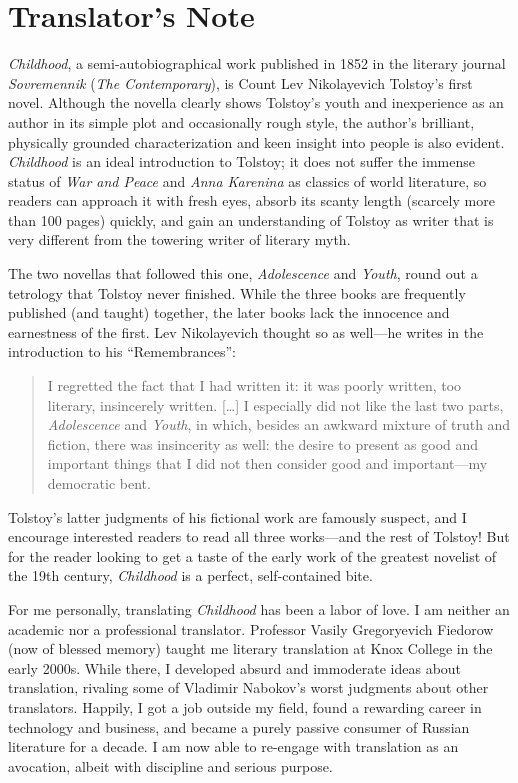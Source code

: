 \chapter{Translator's Note}

\textit{Childhood}, a semi-autobiographical work published in 1852 in the literary journal \textit{Sovremennik} (\textit{The Contemporary}), is Count Lev Nikolayevich Tolstoy's first novel. Although the novella clearly shows Tolstoy's youth and inexperience as an author in its simple plot and occasionally rough style, the author's brilliant, physically grounded characterization and keen insight into people is also evident. \textit{Childhood} is an ideal introduction to Tolstoy; it does not suffer the immense status of \textit{War and Peace} and \textit{Anna Karenina} as classics of world literature, so readers can approach it with fresh eyes, absorb its scanty length (scarcely more than 100 pages) quickly, and gain an understanding of Tolstoy as writer that is very different from the towering writer of literary myth.

The two novellas that followed this one, \textit{Adolescence} and \textit{Youth}, round out a tetrology that Tolstoy never finished. While the three books are frequently published (and taught) together, the later books lack the innocence and earnestness of the first. Lev Nikolayevich thought so as well---he writes in the introduction to his ``Remembrances'':

\begin{quotation}
I regretted the fact that I had written it: it was poorly written, too literary, insincerely written. [\ldots{}] I especially did not like the last two parts, \textit{Adolescence} and \textit{Youth}, in which, besides an awkward mixture of truth and fiction, there was insincerity as well: the desire to present as good and important things that I did not then consider good and important---my democratic bent.
\end{quotation}

Tolstoy's latter judgments of his fictional work are famously suspect, and I encourage interested readers to read all three works---and the rest of Tolstoy! But for the reader looking to get a taste of the early work of the greatest novelist of the 19th century, \textit{Childhood} is a perfect, self-contained bite.

For me personally, translating \textit{Childhood} has been a labor of love. I am neither an academic nor a professional translator. Professor Vasily Gregoryevich Fiedorow (now of blessed memory) taught me literary translation at Knox College in the early 2000s. While there, I developed absurd and immoderate ideas about translation, rivaling some of Vladimir Nabokov's worst judgments about other translators. Happily, I got a job outside my field, found a rewarding career in technology and business, and became a purely passive consumer of Russian literature for a decade. I am now able to re-engage with translation as an avocation, albeit with discipline and serious purpose.

